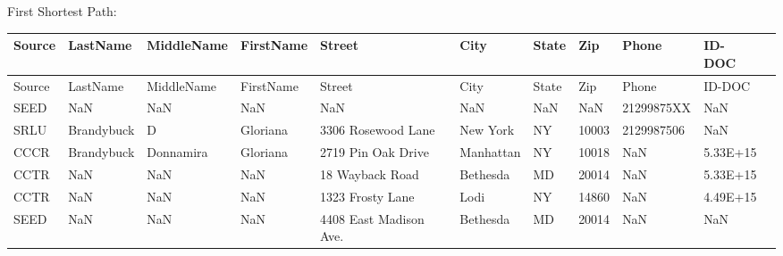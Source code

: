 \documentclass{article} %
\begin{document}
First Shortest Path:

\begin{table}[h]
\centering
\tiny
\begin{tabular}{|l|l|l|l|l|l|l|l|l|l|l|}
\hline
\textbf{Source}  & \textbf{LastName} & \textbf{MiddleName} & \textbf{FirstName} & \textbf{Street} & \textbf{City} & \textbf{State} & \textbf{Zip} & \textbf{Phone} & \textbf{ID-DOC} \\ \hline

Source &LastName &MiddleName &FirstName &Street &City &State & Zip & Phone & ID-DOC \\ \hline
  SEED  &     NaN &       NaN &      NaN &   NaN & NaN &  NaN & NaN &   21299875XX &    NaN \\ \hline
  SRLU  & Brandybuck &  D & Gloriana & 3306 Rosewood Lane & New York &   NY &10003&2129987506&    NaN \\ \hline
  CCCR  & Brandybuck & Donnamira &  Gloriana & 2719 Pin Oak Drive & Manhattan &   NY &10018&  NaN &5.33E+15\\ \hline
  CCTR  &     NaN &       NaN &  NaN &  18 Wayback Road & Bethesda &   MD &20014&  NaN &5.33E+15\\ \hline
  CCTR  &     NaN &       NaN &   NaN & 1323 Frosty Lane &     Lodi &   NY &14860&  NaN &4.49E+15\\ \hline
  SEED  &     NaN &       NaN &      NaN & 4408 East Madison Ave.  &Bethesda&   MD &20014&  NaN &    NaN \\ \hline
\end{tabular}
\end{table}
\end{document}
